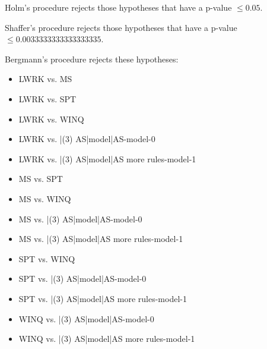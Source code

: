 \documentclass[a3paper,10pt]{article}
\begin{document}
Holm's procedure rejects those hypotheses that have a p-value $\le0.05$.


Shaffer's procedure rejects those hypotheses that have a p-value $\le0.0033333333333333335$.


Bergmann's procedure rejects these hypotheses:


\begin{itemize}


\item LWRK vs. MS
\item LWRK vs. SPT
\item LWRK vs. WINQ
\item LWRK vs. |(3) AS|model|AS-model-0
\item LWRK vs. |(3) AS|model|AS more rules-model-1
\item MS vs. SPT
\item MS vs. WINQ
\item MS vs. |(3) AS|model|AS-model-0
\item MS vs. |(3) AS|model|AS more rules-model-1
\item SPT vs. WINQ
\item SPT vs. |(3) AS|model|AS-model-0
\item SPT vs. |(3) AS|model|AS more rules-model-1
\item WINQ vs. |(3) AS|model|AS-model-0
\item WINQ vs. |(3) AS|model|AS more rules-model-1
\end{itemize}
\end{document}
